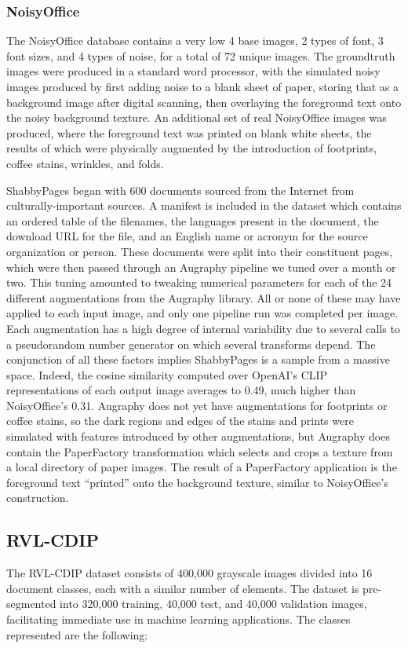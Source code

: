 \documentclass[runningheads]{llncs}
\begin{document}
\subsubsection{NoisyOffice}
The NoisyOffice database \cite{ref_NoisyOffice} contains a very low 4 base images, 2 types of font, 3 font sizes, and 4 types of noise, for a total of 72 unique images.
The groundtruth images were produced in a standard word processor, with the simulated noisy images produced by first adding noise to a blank sheet of paper, storing that as a background image after digital scanning, then overlaying the foreground text onto the noisy background texture.
An additional set of real NoisyOffice images was produced, where the foreground text was printed on blank white sheets, the results of which were physically augmented by the introduction of footprints, coffee stains, wrinkles, and folds.

ShabbyPages began with 600 documents sourced from the Internet from culturally-important sources.
A manifest is included in the dataset which contains an ordered table of the filenames, the languages present in the document, the download URL for the file, and an English name or acronym for the source organization or person.
These documents were split into their constituent pages, which were then passed through an Augraphy pipeline we tuned over a month or two.
This tuning amounted to tweaking numerical parameters for each of the 24 different augmentations from the Augraphy library.
All or none of these may have applied to each input image, and only one pipeline run was completed per image.
Each augmentation has a high degree of internal variability due to several calls to a pseudorandom number generator on which several transforms depend.
The conjunction of all these factors implies ShabbyPages is a sample from a massive space.
Indeed, the cosine similarity computed over OpenAI's CLIP representations of each output image averages to 0.49, much higher than NoisyOffice's 0.31.
Augraphy does not yet have augmentations for footprints or coffee stains, so the dark regions and edges of the stains and prints were simulated with features introduced by other augmentations, but Augraphy does contain the PaperFactory transformation which selects and crops a texture from a local directory of paper images.
The result of a PaperFactory application is the foreground text ``printed'' onto the background texture, similar to NoisyOffice's construction.

\subsection{RVL-CDIP}
The RVL-CDIP dataset \cite{ref_RVL-CDIP} consists of 400,000 grayscale images divided into 16 document classes, each with a similar number of elements.
The dataset is pre-segmented into 320,000 training, 40,000 test, and 40,000 validation images, facilitating immediate use in machine learning applications.
The classes represented are the following:
\end{document}
